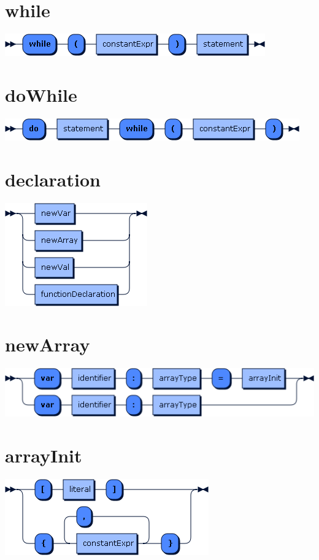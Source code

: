 \begin{appendices}
\section*{while}\includegraphics[scale=0.7]{img/ebnf_grammar/while}
\section*{doWhile}\includegraphics[scale=0.7]{img/ebnf_grammar/doWhile}

\section*{declaration}\includegraphics[scale=0.7]{img/ebnf_grammar/declaration}
\section*{newArray}\includegraphics[scale=0.7]{img/ebnf_grammar/newArray}
\section*{arrayInit}\includegraphics[scale=0.7]{img/ebnf_grammar/arrayInit}

\end{appendices}
